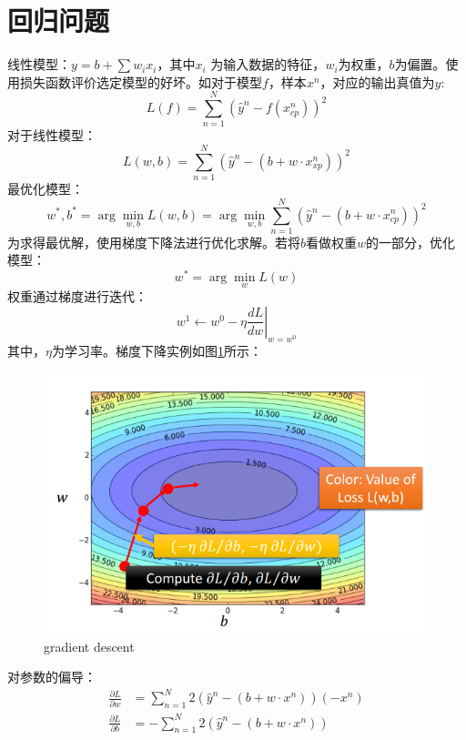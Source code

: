 \documentclass[UTF8]{ctexbook}
\begin{document}
\section{回归问题}
线性模型：$y=b+\sum w_i x_i$，其中$x_i$ 为输入数据的特征，$w_i$为权重，$b$为偏置。使用损失函数评价选定模型的好坏。如对于模型$f$，样本$x^n$，对应的输出真值为$\hat{y}$:
\[
	L(f)=\sum_{n=1}^{N}\left( \hat{y}^n - f(x_{cp}^n) \right)^2
\]
对于线性模型：
\[
	L(w,b)=\sum_{n=1}^{N}\left( \hat{y}^n - (b+w \cdot x_{xp}^n) \right)^2
\]
最优化模型：
\[
	w ^ { * } , b ^ { * } = \arg \min _ { w , b } L ( w , b )= \arg \min _ { w , b } \sum _ { n = 1 } ^ { N } \left( \hat { y } ^ { n } - ( b + w \cdot x _ { c p } ^ { n } ) \right) ^ { 2 }
\]
为求得最优解，使用梯度下降法进行优化求解。若将$b$看做权重$w$的一部分，优化模型：
\[
	w^* = \arg \min_w L(w)
\]
权重通过梯度进行迭代：
\[
w ^1 \leftarrow w ^0 - \eta \left. \frac { d L } { d w } \right| _ {w = w^0}
\]
其中，$\eta$为学习率。梯度下降实例如图\ref{fig:gradientdescent}所示：
\begin{figure}[hb]
	\centering
	\includegraphics[scale=0.8]{pic/gradient_descent}
	\caption{gradient descent}
	\label{fig:gradientdescent}
\end{figure}
对参数的偏导：
\begin{align*}
	\frac{ \partial L}{\partial w} &= \sum_{n=1}^{N} 2 \left( \hat{y}^n - (b+w \cdot x^n)  \right) (-x^n) \\
	\frac{ \partial L}{\partial b} &= -\sum_{n=1}^{N} 2 \left( \hat{y}^n - (b+w \cdot x^n)  \right)
\end{align*}
\end{document}
